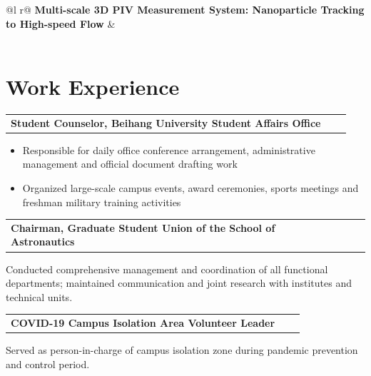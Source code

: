 \documentclass[a4paper,12pt]{article}
\makeatletter
\newenvironment{jobshort}[2]
    {
    \begin{tabularx}{\linewidth}{@{}l X r@{}}
    \textbf{#1} & \hfill &  #2 \\[3.75pt]
    \end{tabularx}
    }
    {
    }
\newenvironment{joblong}[2]
    {
    \begin{tabularx}{\linewidth}{@{}l X r@{}}
    \textbf{#1} & \hfill &  #2 \\[3.75pt]
    \end{tabularx}
    \begin{minipage}[t]{\linewidth}
    \begin{itemize}[nosep,after=\strut, leftmargin=1em, itemsep=3pt,label=--]
    }
    {
    \end{itemize}
    \end{minipage}    
    }
\makeatother
\begin{document}
\begin{tabularx}{\linewidth}{ @{}l r@{} }
\textbf{Multi-scale 3D PIV Measurement System: Nanoparticle Tracking to High-speed Flow} & \\
  \\
\end{tabularx}




\section{\textbf{Work Experience}}

\begin{joblong}{Student Counselor, Beihang University Student Affairs Office}{}
\item Responsible for daily office conference arrangement, administrative management and official document drafting work
\item Organized large-scale campus events, award ceremonies, sports meetings and freshman military training activities
\end{joblong}

\begin{jobshort}{Chairman, Graduate Student Union of the School of Astronautics}{}
Conducted comprehensive management and coordination of all functional departments; maintained communication and joint research with institutes and technical units.
\end{jobshort}

\begin{jobshort}{COVID-19 Campus Isolation Area Volunteer Leader}{}
Served as person-in-charge of campus isolation zone during pandemic prevention and control period.
\end{jobshort}


\end{document}

